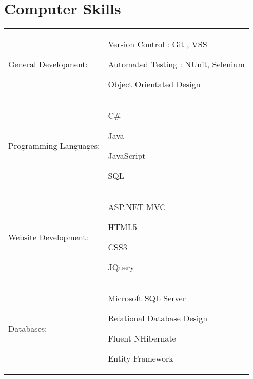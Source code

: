 \documentclass[a4paper,10pt]{article} %
\begin{document}

\section{Computer Skills}

\begin{tabular}{ p{4cm} p{9cm}}
General Development:
&\MPtrue	    \begin{compactitem}
		\item Version Control : Git , VSS
		\item Automated Testing : NUnit, Selenium
		\item Object Orientated Design
	\end{compactitem} \\
%
Programming Languages:
&\MPtrue	    \begin{compactitem}
		\item C\#
		\item Java
		\item JavaScript
		\item SQL
	\end{compactitem} \\
%
Website Development:
&\MPtrue	    \begin{compactitem}
		\item ASP.NET MVC
		\item HTML5
		\item CSS3
		\item JQuery
	\end{compactitem} \\
%
Databases: 
&\MPtrue	    \begin{compactitem}
		\item Microsoft SQL Server
		\item Relational Database Design
		\item Fluent NHibernate
		\item Entity Framework
	\end{compactitem} \\
\end{tabular}
\end{document}
